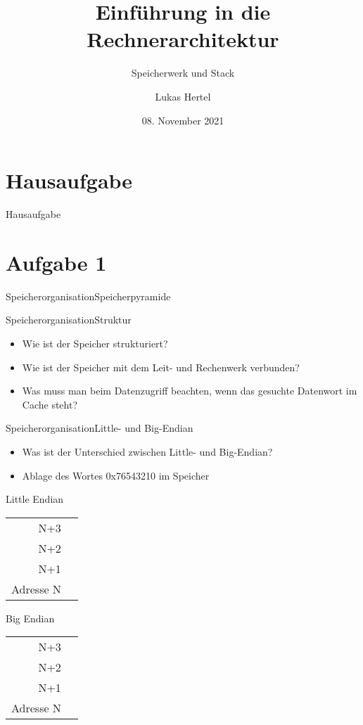 \documentclass[
  german,            %
  aspectratio=169,    %
  sectionpage=false,   %
]{tumbeamer}
\title{Einführung in die Rechnerarchitektur}
\subtitle{Speicherwerk und Stack}
\author{Lukas Hertel}
\institute{\theChairName\\\theDepartmentName\\\theUniversityName}
\date[08.11.2021]{08. November 2021}
\begin{document}
\maketitle

\section{Hausaufgabe}
\begin{frame}{Hausaufgabe}

\end{frame}
\section{Aufgabe 1}
\begin{frame}{Speicherorganisation}{Speicherpyramide}
\end{frame}
\begin{frame}{Speicherorganisation}{Struktur}
	\begin{itemize}
		\item Wie ist der Speicher strukturiert?
		\item Wie ist der Speicher mit dem Leit- und Rechenwerk verbunden?
		\item Was muss man beim Datenzugriff beachten, wenn das gesuchte Datenwort im Cache
		steht?
	\end{itemize}
\end{frame}
\begin{frame}{Speicherorganisation}{Little- und Big-Endian}
	\begin{itemize}
		\item Was ist der Unterschied zwischen Little- und Big-Endian?
		\item Ablage des Wortes 0x76543210 im Speicher
	\end{itemize}
\vspace{1cm}
\begin{minipage}[t]{0.45\textwidth}
	Little Endian
	\begin{tabular}{r|c|}
		N+3 & \hspace{1cm} \\
		N+2 & \\
		N+1 & \\
		Adresse N & \\
	\end{tabular}
\end{minipage}
\begin{minipage}[t]{0.45\textwidth}
	Big Endian
	\begin{tabular}{r|c|}
		N+3 & \hspace{1cm} \\
		N+2 & \\
		N+1 & \\
		Adresse N & \\
	\end{tabular}
\end{minipage}
\end{frame}
\end{document}
